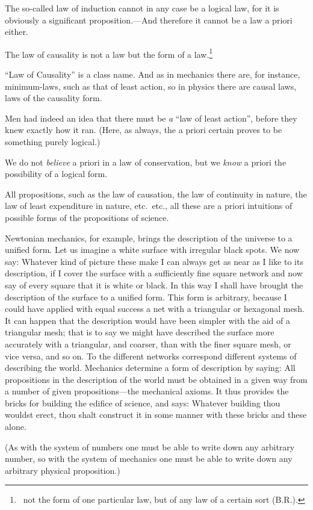 {The so-called law of induction cannot in any
case be a logical law, for it is obviously a significant
proposition.---And therefore it cannot be
a law a priori either.}


{The law of causality is not a law but the form
of a law.\footnote{\IdEst\ not the form of one particular law, but of any law of a certain
sort (B.\;R.).}}


{``Law of Causality'' is a class name. And as
in mechanics there are, for instance, minimum-laws,
such as that of least action, so in physics
there are causal laws, laws of the causality
form.}


{Men had indeed an idea that there must be
\emph{a} ``law of least action'', before they knew
exactly how it ran. (Here, as always, the a
priori certain proves to be something purely
logical.)}


{We do not \emph{believe} a priori in a law of conservation,
but we \emph{know} a priori the possibility of
a logical form.}


{All propositions, such as the law of causation,
the law of continuity in nature, the law of least
expenditure in nature, etc.\ etc., all these are
a priori intuitions of possible forms of the propositions
of science.}


{Newtonian mechanics, for example, brings the
description of the universe to a unified form.
Let us imagine a white surface with irregular
black spots. We now say: Whatever kind of
picture these make I can always get as near as
I like to its description, if I cover the surface
with a sufficiently fine square network and now
say of every square that it is white or black.
In this way I shall have brought the description
of the surface to a unified form. This form is
arbitrary, because I could have applied with equal
success a net with a triangular or hexagonal
mesh. It can happen that the description would
have been simpler with the aid of a triangular
mesh; that is to say we might have described
the surface more accurately with a triangular,
and coarser, than with the finer square mesh, or
vice versa, and so on. To the different networks
correspond different systems of describing the
world. Mechanics determine a form of description
by saying: All propositions in the description
of the world must be obtained in a given
way from a number of given propositions---the
mechanical axioms. It thus provides the bricks
for building the edifice of science, and says:
Whatever building thou wouldst erect, thou shalt
construct it in some manner with these bricks
and these alone.

(As with the system of numbers one must be
able to write down any arbitrary number, so
with the system of mechanics one must be able
to write down any arbitrary physical proposition.)}


